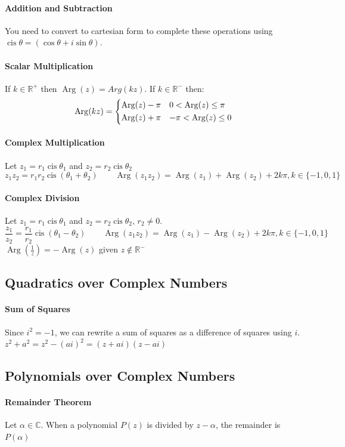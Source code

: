 \documentclass[a4paper,twoside]{article}
\DeclareMathOperator\cis{cis}
\DeclareMathOperator\Arg{Arg}
\begin{document}
			\paragraph{Addition and Subtraction} You need to convert to cartesian form to complete these operations using $\cis\theta=(\cos\theta+i\sin\theta)$.
			\paragraph{Scalar Multiplication} If $k\in\mathbb{R}^+$ then $\Arg(z)=Arg(kz)$. If $k\in\mathbb{R}^-$ then:
			\[
				\Arg(kz)=\begin{cases*}
					\Arg(z)-\pi & $0<\Arg(z)\leq\pi$ \\
					\Arg(z)+\pi & $-\pi<\Arg(z)\leq0$
				\end{cases*}
			\]
			\paragraph{Complex Multiplication} Let $z_1=r_1\cis\theta_1$ and $z_2=r_2\cis\theta_2$
			\[
				z_1z_2=r_1r_2\cis(\theta_1+\theta_2) \qquad \Arg(z_1z_2)=\Arg(z_1)+\Arg(z_2)+2k\pi,k\in\{-1,0,1\}
			\]
			\paragraph{Complex Division} Let $z_1=r_1\cis\theta_1$ and $z_2=r_2\cis\theta_2$, $r_2\neq0$.
			\[
				\frac{z_1}{z_2}=\frac{r_1}{r_2}\cis\left(\theta_1-\theta_2\right) \qquad \Arg(z_1z_2)=\Arg(z_1)-\Arg(z_2)+2k\pi,k\in\{-1,0,1\}
			\]
			$\Arg(\frac{1}{z})=-\Arg(z)$ given $z\notin\mathbb{R}^-$
		\subsection{Quadratics over Complex Numbers}
			\paragraph{Sum of Squares} Since $i^2=-1$, we can rewrite a sum of squares as a difference of squares using $i$. $z^2+a^2=z^2-(ai)^2=(z+ai)(z-ai)$
		\subsection{Polynomials over Complex Numbers}
			\paragraph{Remainder Theorem} Let $\alpha\in\mathbb{C}$. When a polynomial $P(z)$ is divided by $z-\alpha$, the remainder is $P(\alpha)$
\end{document}
